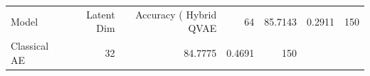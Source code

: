 \begin{tabular}{lrrrr}
\toprule
Model & Latent Dim & Accuracy (%
\midrule
Hybrid QVAE & 64 & 85.7143 & 0.2911 & 150 \\
Classical AE & 32 & 84.7775 & 0.4691 & 150 \\
\bottomrule
\end{tabular}

